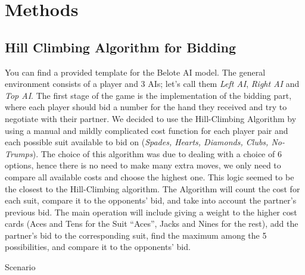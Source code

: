 \section{Methods}\label{ModelDescription}
\subsection{Hill Climbing Algorithm for Bidding}
\hspace{\parindent}You can find a provided template for the Belote AI model.
The general environment consists of a player and 3 AIs; let’s call them \textit{Left
AI}, \textit{Right AI} and \textit{Top AI}. The first stage of the game is the implementation of
the bidding part, where each player should bid a number for the hand they received
and try to negotiate with their partner. We decided to use the Hill-Climbing Algorithm by
using a manual and mildly complicated cost function for each player pair and each
possible suit available to bid on (\textit{Spades, Hearts, Diamonds, Clubs, No-Trumps}). The choice
of this algorithm was due to dealing with a choice of 6 options, hence there is no need
to make many extra moves, we only need to compare all available costs and choose the highest one.
This logic seemed to be the closest to the Hill-Climbing algorithm.
The Algorithm will count the cost for each suit, compare it to the opponents’
bid, and take into account the partner’s previous bid. The main operation will include
giving a weight to the higher cost cards (Aces and Tens for the Suit “Aces”, Jacks and
Nines for the rest), add the partner’s bid to the corresponding suit, find the maximum
among the 5 possibilities, and compare it to the opponents’ bid.
\par Scenario


